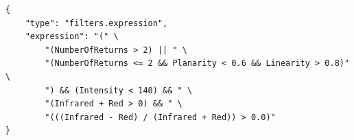 \begin{lstlisting}[label={lst:pdal_filter}, caption={[Vegetationsfilterung]Logische Filterkriterien für die Vegetationsextraktion}, breaklines=true, breakatwhitespace=true]
{
    "type": "filters.expression",
    "expression": "(" \
        "(NumberOfReturns > 2) || " \
        "(NumberOfReturns <= 2 && Planarity < 0.6 && Linearity > 0.8)" \
        ") && (Intensity < 140) && " \
        "(Infrared + Red > 0) && " \
        "(((Infrared - Red) / (Infrared + Red)) > 0.0)"
} 

\end{lstlisting}